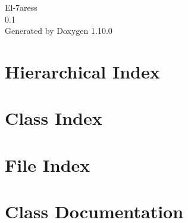 \documentclass[twoside]{book}
\newcommand{\+}{\discretionary{\mbox{\scriptsize$\hookleftarrow$}}{}{}}
\newcommand{\clearemptydoublepage}{%
    \newpage{\pagestyle{empty}\cleardoublepage}%
  }
\begin{document}
  \raggedbottom
    \hypersetup{pageanchor=false,
                bookmarksnumbered=true,
                pdfencoding=unicode
               }
  \begin{titlepage}
  \vspace*{7cm}
  \begin{center}%
  {\Large El-\/7aress}\\
  [1ex]\large 0.\+1 \\
  \vspace*{1cm}
  {\large Generated by Doxygen 1.10.0}\\
  \end{center}
  \end{titlepage}
  \clearemptydoublepage
  \tableofcontents
  \clearemptydoublepage
  \hypersetup{pageanchor=true}
\chapter{Hierarchical Index}

\chapter{Class Index}

\chapter{File Index}

\chapter{Class Documentation}




































\end{document}
